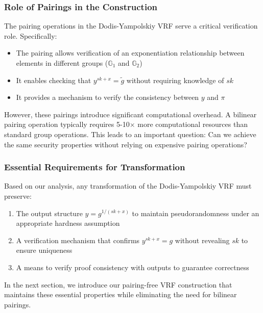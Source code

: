 \subsubsection{Role of Pairings in the Construction}

The pairing operations in the Dodis-Yampolskiy VRF serve a critical verification role. Specifically:

\begin{itemize}
    \item The pairing allows verification of an exponentiation relationship between elements in different groups ($\mathbb{G}_1$ and $\mathbb{G}_2$)
    \item It enables checking that $y^{sk+x} = \tilde{g}$ without requiring knowledge of $sk$
    \item It provides a mechanism to verify the consistency between $y$ and $\pi$
\end{itemize}

However, these pairings introduce significant computational overhead. A bilinear pairing operation typically requires 5-10$\times$ more computational resources than standard group operations. This leads to an important question: Can we achieve the same security properties without relying on expensive pairing operations?

\subsubsection{Essential Requirements for Transformation}

Based on our analysis, any transformation of the Dodis-Yampolskiy VRF must preserve:

\begin{enumerate}
    \item The output structure $y = g^{1/(sk+x)}$ to maintain pseudorandomness under an appropriate hardness assumption
    
    \item A verification mechanism that confirms $y^{sk+x} = g$ without revealing $sk$ to ensure uniqueness
    
    \item A means to verify proof consistency with outputs to guarantee correctness
\end{enumerate}

In the next section, we introduce our pairing-free VRF construction that maintains these essential properties while eliminating the need for bilinear pairings.

























